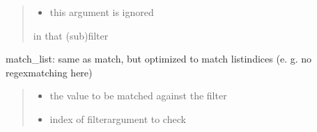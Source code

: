 \documentclass[a4paper,10pt,english]{sphinxmanual}
\begin{document}
\begin{fulllineitems}
\begin{fulllineitems}
\begin{quote}
\begin{description}
\begin{itemize}
\item {}
\sphinxAtStartPar
\sphinxstyleliteralstrong{\sphinxupquote{\_}} \textendash{} this argument is ignored

\end{itemize}

\sphinxAtStartPar
\begin{description}
\sphinxAtStartPar
in that (sub)filter

\end{description}


\end{description}\end{quote}

\end{fulllineitems}


\begin{fulllineitems}
\label{\detokenize{fagus.filters:fagus.filters.KFil.match_list}}
\pysigstartsignatures
{}
\pysigstopsignatures
\sphinxAtStartPar
match\_list: same as match, but optimized to match list\sphinxhyphen{}indices (e. g. no regex\sphinxhyphen{}matching here)
\begin{quote}\begin{description}
\begin{itemize}
\item {}
\sphinxAtStartPar
{} \textendash{} the value to be matched against the filter

\item {}
\sphinxAtStartPar
{} \textendash{} index of filter\sphinxhyphen{}argument to check


\end{itemize}
\end{description}
\end{quote}
\end{fulllineitems}
\end{fulllineitems}
\end{document}
